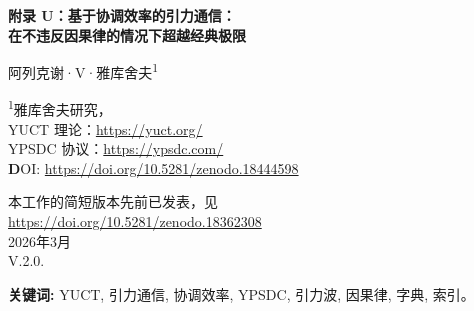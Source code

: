 \documentclass[12pt,a4paper]{article}
\newcommand{\Keff}{K_{\mathrm{eff}}}
\begin{document}
	
	\begin{titlepage}
		\begin{center}
			\vspace*{1cm}
			\Huge \textbf{附录 U：基于协调效率的引力通信：\\ 在不违反因果律的情况下超越经典极限}
			
			\vspace{1cm}
			\Large 阿列克谢·V·雅库舍夫\textsuperscript{1}
			
			\vspace{0.5cm}
			\large \textsuperscript{1}雅库舍夫研究， \\
			YUCT 理论：\url{https://yuct.org/}\\
			YPSDC 协议：\url{https://ypsdc.com/}\\
			
			\vspace{2cm}
			\textbf DOI: \url{https://doi.org/10.5281/zenodo.18444598}\\
			
			\vspace{1cm}
			
			\vspace{0cm}
			\large 
			本工作的简短版本先前已发表，见\\ \url{https://doi.org/10.5281/zenodo.18362308}\\
			\vspace{1cm}
			2026年3月 \\ \large V.2.0.
			
			\newpage
			\vspace{2cm}
			\begin{abstract}
				\noindent
				我们基于雅库舍夫统一协调理论（YUCT）提出一种新的远距离通信方法。通过将引力场视为天然存在的全局字典，我们表明，短的索引（引力微扰）可以在远距离观测者之间协调状态，其有效效率 \(\Keff\) 形式上超越光速极限，但又不违反因果律。关键在于离线字典分发（预先存在的引力场）与在线索引传输（光速引力波）的分离。引力波穿透物质无衰减，相比电磁信号具有显著优势。我们推导了基本方程，估计了可达到的效率，并提出使用高精度重力仪进行实验验证。这项工作为新型通信系统开辟了道路，其中延迟主要由本地处理决定，而非距离。
			\end{abstract}
			
			\vspace{0.5cm}
			\noindent \textbf{关键词:} YUCT, 引力通信, 协调效率, YPSDC, 引力波, 因果律, 字典, 索引。
		\end{center}
	\end{titlepage}
	
	\tableofcontents
	\newpage
	
\end{document}
